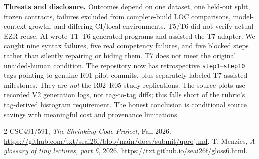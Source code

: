 \documentclass[sigconf,nonacm]{acmart}
\begin{document}
\textbf{Threats and disclosure.} Outcomes depend on one dataset, one held-out split, frozen contracts, failures excluded from complete-build LOC comparisons, model-context growth, and differing CI/local environments. T5/T6 did not verify actual EZR reuse. AI wrote T1--T6 generated programs and assisted the T7 adapter. We caught nine syntax failures, five real competency failures, and five blocked steps rather than silently repairing or hiding them. T7 does not meet the original unaided-human condition. The repository now has retrospective \texttt{step1}--\texttt{step10} tags pointing to genuine R01 pilot commits, plus separately labeled T7-assisted milestones. They are \emph{not} the R02--R05 study replications. The source plots use recorded V2 generation logs, not tag-to-tag diffs; this falls short of the rubric's tag-derived histogram requirement. The honest conclusion is conditional source savings with meaningful cost and provenance limitations.

\begin{thebibliography}{2}
 CSC491/591, \emph{The Shrinking-Code Project}, Fall 2026. \url{https://github.com/txt/seai26f/blob/main/docs/submit/uproj.md}.
 T. Menzies, \emph{A glossary of tiny lectures, part 6}, 2026. \url{https://txt.github.io/seai26f/gloss6.html}.
\end{thebibliography}
\end{document}
